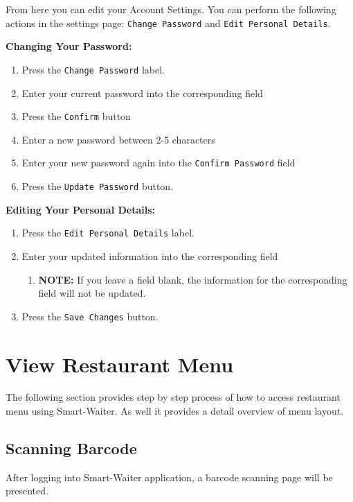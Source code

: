 \documentclass[12pt, titlepage]{article}
\begin{document}
From here you can edit your Account Settings. You can perform the following actions in the settings page: \texttt{Change Password} and \texttt{Edit Personal Details}.

\textbf{Changing Your Password:}
	\begin{enumerate}
		\item Press the \texttt{Change Password} label.
		\item Enter your current password into the corresponding field
		\item Press the \texttt{Confirm} button
		\item Enter a new password between 2-5 characters
		\item Enter your new password again into the \texttt{Confirm Password} field
		\item Press the \texttt{Update Password} button.
	\end{enumerate}
	
\textbf{Editing Your Personal Details:}
	\begin{enumerate}
		\item Press the \texttt{Edit Personal Details} label.
		\item Enter your updated information into the corresponding field
		\begin{enumerate}
			\item \textbf{NOTE:} If you leave a field blank, the 						information for the corresponding field will not be updated.
		\end{enumerate}
		\item Press the \texttt{Save Changes} button.
	\end{enumerate}

\section{View Restaurant Menu}
The following section provides step by step process of how to access restaurant menu using Smart-Waiter. As well it provides a detail overview of menu layout.
\subsection{Scanning Barcode}
After logging into Smart-Waiter application, a barcode scanning page will be presented.
\end{document}
